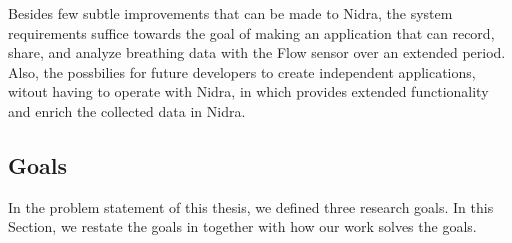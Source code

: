 Besides few subtle improvements that can be made to Nidra, the system requirements suffice towards the goal of making an application that can record, share, and analyze breathing data with the Flow sensor over an extended period. Also, the possbilies for future developers to create independent applications, witout having to operate with Nidra, in which provides extended functionality and enrich the collected data in Nidra. 

\subsection{Goals}

In the problem statement of this thesis, we defined three research goals. In this Section, we restate the goals in together with how our work solves the goals. 

